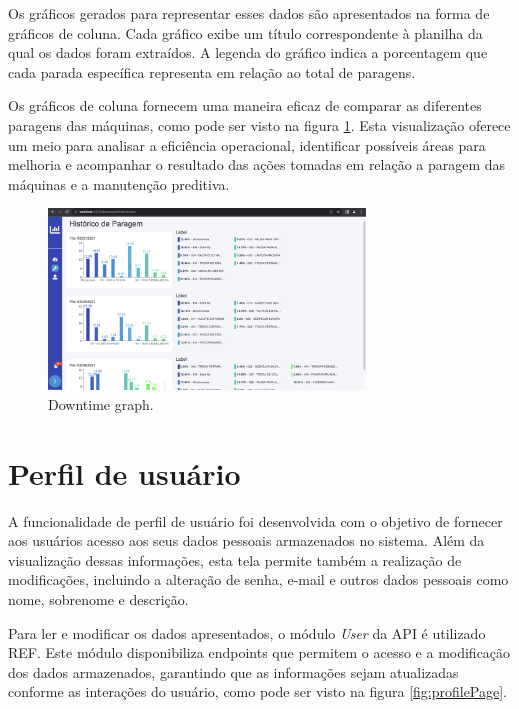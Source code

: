 Os gráficos gerados para representar esses dados são apresentados na forma de gráficos de coluna. Cada gráfico exibe um título correspondente à planilha da qual os dados foram extraídos. A legenda do gráfico indica a porcentagem que cada parada específica representa em relação ao total de paragens.

Os gráficos de coluna fornecem uma maneira eficaz de comparar as diferentes paragens das máquinas, como pode ser visto na figura \ref{fig:downtime}. Esta visualização oferece um meio para analisar a eficiência operacional, identificar possíveis áreas para melhoria e acompanhar o resultado das ações tomadas em relação a paragem das máquinas e a manutenção preditiva.

\begin{figure}[htbp]
	\centering
	\includegraphics[width=0.75\textwidth]{images/downtime.png}
	\caption{Downtime graph.}
	\label{fig:downtime}
\end{figure}

\section[Perfil de usuário]{Perfil de usuário}\label{sec:profile}

A funcionalidade de perfil de usuário foi desenvolvida com o objetivo de fornecer aos usuários acesso aos seus dados pessoais armazenados no sistema. Além da visualização dessas informações, esta tela permite também a realização de modificações, incluindo a alteração de senha, e-mail e outros dados pessoais como nome, sobrenome e descrição.

Para ler e modificar os dados apresentados, o módulo \textit{User} da API é utilizado REF. Este módulo disponibiliza endpoints que permitem o acesso e a modificação dos dados armazenados, garantindo que as informações sejam atualizadas conforme as interações do usuário, como pode ser visto na figura \ref{fig:profilePage}.

